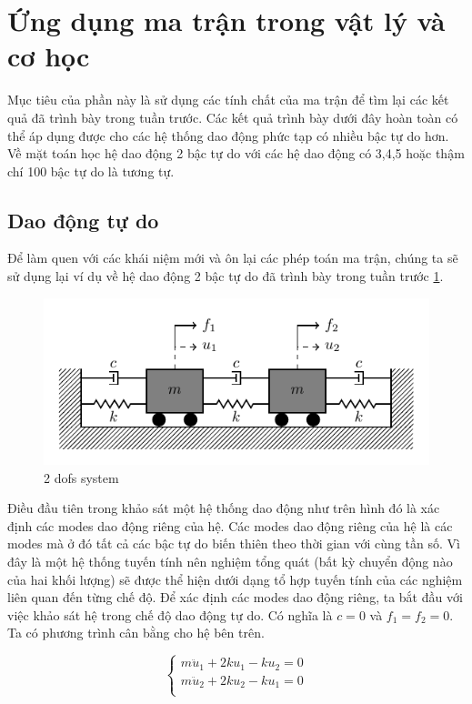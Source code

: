 \section{Ứng dụng ma trận trong vật lý và cơ học}\label{sec_1}

Mục tiêu của phần này là sử dụng các tính chất của ma trận để tìm lại các kết quả đã trình bày trong tuần trước. Các kết quả trình bày dưới đây hoàn toàn có thể áp dụng được cho các hệ thống dao động phức tạp có nhiều bậc tự do hơn. Về mặt toán học hệ dao động 2 bậc tự do với các hệ dao động có 3,4,5 hoặc thậm chí 100 bậc tự do là tương tự.

\subsection{Dao động tự do}

Để làm quen với các khái niệm mới và ôn lại các phép toán ma trận, chúng ta sẽ sử dụng lại ví dụ về hệ dao động 2 bậc tự do đã trình bày trong tuần trước \cref{fig_2dofs}.

\begin{figure}[htbp]
    \centering
    \includegraphics[width=1.\textwidth]{Tuan6/figure/mass_spring_damper_2dofs.pdf}
    \caption{2 dofs system}
    \label{fig_2dofs}
\end{figure}

Điều đầu tiên trong khảo sát một hệ thống dao động như trên hình đó là xác định các modes dao động riêng của hệ. Các modes dao động riêng của hệ là các modes mà ở đó tất cả các bậc tự do biến thiên theo thời gian với cùng tần số. Vì đây là một hệ thống tuyến tính nên nghiệm tổng quát (bất kỳ chuyển động nào của hai khối lượng) sẽ được thể hiện dưới dạng tổ hợp tuyến tính của các nghiệm liên quan đến từng chế độ. Để xác định các modes dao động riêng, ta bắt đầu với việc khảo sát hệ trong chế độ dao động tự do. Có nghĩa là $c=0$ và $f_1=f_2=0$. Ta có phương trình cân bằng cho hệ bên trên.

\begin{equation}\label{eq_PT2dofs}
    \begin{cases}
        m \ddot{u}_1 + 2ku_1 - ku_2 = 0 \\
        m \ddot{u}_2 + 2ku_2 - ku_1 = 0 \\
    \end{cases}
\end{equation}

